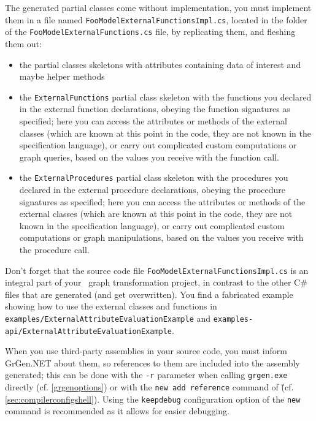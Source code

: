 \pagebreak

\noindent The generated partial classes come without implementation, you must implement them in a file named \texttt{Foo\-Model\-External\-Functions\-Impl.cs}, located in the folder of the \texttt{Foo\-Model\-External\-Functions.cs} file, by replicating them, and fleshing them out:
\begin{itemize}
	\item the partial classes skeletons with attributes containing data of interest and maybe helper methods
	\item the \texttt{ExternalFunctions} partial class skeleton with the functions you declared in the external function declarations, obeying the function signatures as specified;
here you can access the attributes or methods of the external classes (which are known at this point in the code, they are not known in the specification language), or carry out complicated custom computations or graph queries, based on the values you receive with the function call.
	\item the \texttt{ExternalProcedures} partial class skeleton with the procedures you declared in the external procedure declarations, obeying the procedure signatures as specified;
here you can access the attributes or methods of the external classes (which are known at this point in the code, they are not known in the specification language), or carry out complicated custom computations or graph manipulations, based on the values you receive with the procedure call.
\end{itemize}

\noindent Don't forget that the source code file \texttt{Foo\-Model\-External\-Functions\-Impl.cs} is an integral part of your \GrG~graph transformation project, in contrast to the other C\# files that are generated (and get overwritten).
You find a fabricated example showing how to use the external classes and functions in \texttt{examples/External\-Attribute\-Evaluation\-Example} and \texttt{examples-api/External\-Attribute\-Evaluation\-Example}.

When you use third-party assemblies in your source code, you must inform GrGen.NET about them, so references to them are included into the assembly generated; this can be done with the \texttt{-r} parameter when calling \texttt{grgen.exe} directly (cf. \ref{grgenoptions}) or with the \texttt{new add reference} command of \GrShell\~(cf. \ref{sec:compilerconfigshell}). 
Using the \texttt{keepdebug} configuration option of the \texttt{new} command is recommended as it allows for easier debugging.

